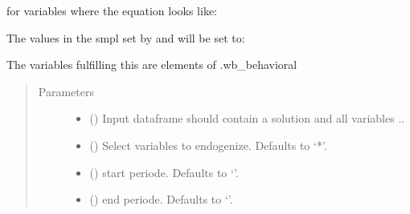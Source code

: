 \documentclass[letterpaper,10pt,english]{sphinxmanual}
\begin{document}
\begin{fulllineitems}
\begin{fulllineitems}
\sphinxAtStartPar
for variables where the equation looks like:

\begin{sphinxVerbatim}[commandchars=\\\{\}]
  
\end{sphinxVerbatim}

\sphinxAtStartPar
The values in the smpl set by  and  will be set to:

\begin{sphinxVerbatim}[commandchars=\\\{\}]
  
  
\end{sphinxVerbatim}

\sphinxAtStartPar
The variables fulfilling this are elements of .wb\_behavioral
\begin{quote}\begin{description}
\item[{Parameters}] \leavevmode\begin{itemize}
\item {} 
\sphinxAtStartPar
{} () \textendash{} Input dataframe should contain a solution and all variables ..

\item {} 
\sphinxAtStartPar
{} (\sphinxstyleliteralemphasis{\sphinxupquote{, }}) \textendash{} Select variables to endogenize. Defaults to ‘*’.

\item {} 
\sphinxAtStartPar
{} (\sphinxstyleliteralemphasis{\sphinxupquote{, }}) \textendash{} start periode. Defaults to ‘’.

\item {} 
\sphinxAtStartPar
{} (\sphinxstyleliteralemphasis{\sphinxupquote{, }}) \textendash{} end periode. Defaults to ‘’.


\end{itemize}
\end{description}
\end{quote}
\end{fulllineitems}
\end{fulllineitems}
\end{document}
